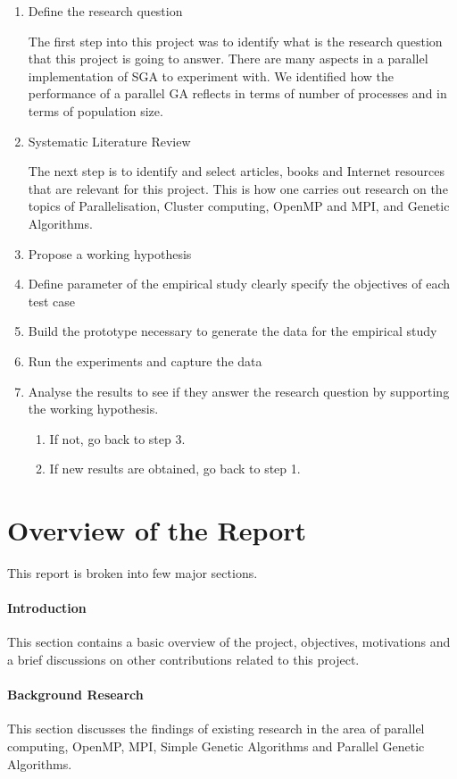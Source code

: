 \begin{enumerate}
	\item Define the research question
	
	The first step into this project was to identify what is the research question that this project is going to answer. There are many aspects in a parallel implementation of SGA to experiment with. We identified how the performance of a parallel GA reflects in terms of number of processes and in terms of population size.
	\item Systematic Literature Review
	
The next step is to identify and select articles, books and Internet resources that are relevant for this project. This is how one carries out research on the topics of Parallelisation, Cluster computing, OpenMP and MPI, and Genetic Algorithms.

	\item Propose a working hypothesis
	
	\item Define parameter of the empirical study clearly specify the objectives of each test case
	
	\item Build the prototype necessary to generate the data for the empirical study
	\item Run the experiments and capture the data
	\item Analyse the results to see if they answer the research question by supporting the working hypothesis.
	\begin{enumerate}
		\item If not, go back to step 3.
		\item If new results are obtained, go back to step 1.
	\end{enumerate}
\end{enumerate}



\section{Overview of the Report}
This report is broken into few major sections.
\paragraph{Introduction}
This section contains a basic overview of the project, objectives, motivations and a brief discussions on other contributions related to this project.
\paragraph {Background Research}
This section discusses the findings of existing research in the area of parallel computing, OpenMP, MPI, Simple Genetic Algorithms and Parallel Genetic Algorithms.
